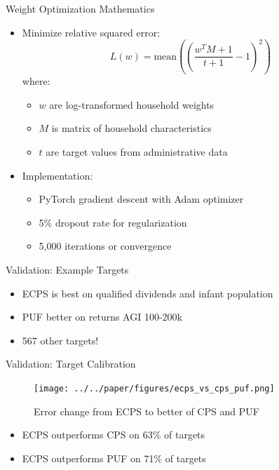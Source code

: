 \documentclass{beamer}
\begin{document}
\begin{frame}{Weight Optimization Mathematics}
    \begin{itemize}
        \item Minimize relative squared error:
        \vspace{0.5cm}
        \[ L(w) = \text{mean}\left(\left(\frac{w^T M + 1}{t + 1} - 1\right)^2\right) \]
        \vspace{0.5cm}
        where:
        \begin{itemize}
            \item $w$ are log-transformed household weights
            \item $M$ is matrix of household characteristics
            \item $t$ are target values from administrative data
        \end{itemize}
    \end{itemize}
    \begin{itemize}
        \item Implementation:
        \begin{itemize}
            \item PyTorch gradient descent with Adam optimizer
            \item 5\% dropout rate for regularization
            \item 5,000 iterations or convergence
        \end{itemize}
    \end{itemize}
\end{frame}

\begin{frame}{Validation: Example Targets}
    \begin{table}
        \small
        \centering
        
    \end{table}
    \begin{itemize}
        \item ECPS is best on qualified dividends and infant population
        \item PUF better on returns AGI 100-200k
        \item 567 other targets!
    \end{itemize}
\end{frame}

\begin{frame}{Validation: Target Calibration}
    \begin{figure}
        \centering
        \texttt{[image: ../../paper/figures/ecps\_vs\_cps\_puf.png]}
        \caption{Error change from ECPS to better of CPS and PUF}
    \end{figure}
    \begin{itemize}
        \item ECPS outperforms CPS on 63\% of targets
        \item ECPS outperforms PUF on 71\% of targets
    \end{itemize}
\end{frame}
\end{document}
